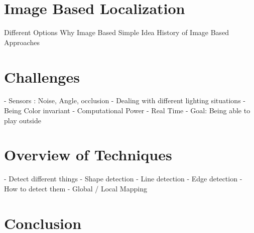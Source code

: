 \documentclass[12pt, a4paper]{scrartcl}
\begin{document}
  \section{Image Based Localization}
  Different Options
  Why Image Based
  Simple Idea
  History of Image Based Approaches

  \section{Challenges}
  - Sensors : Noise, Angle, occlusion
  - Dealing with different lighting situations
  - Being Color invariant
  - Computational Power
  - Real Time
  - Goal: Being able to play outside

  \section{Overview of Techniques}
  - Detect different things
  - Shape detection
  - Line detection
  - Edge detection
  - How to detect them
  - Global / Local Mapping

  \section{Conclusion}
\end{document}
